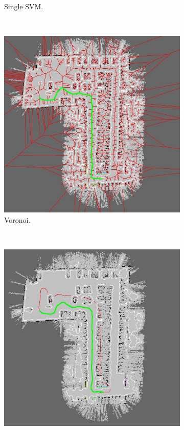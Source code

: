 \begin{figure}[h!]
\begin{subfigure}[b]{0.45\textwidth}
	  \caption{Single \ac{SVM}.}
	  \label{fig:cp06_singl_svm_final}
  \end{subfigure}
  ~
  \begin{subfigure}[b]{0.45\textwidth}
	  \centering
	  \includegraphics[width=\textwidth,height=\textwidth, trim=0 0 0 0,clip]{figure16}
	  \caption{Voronoi.}
	  \label{fig:cp06_voronoi_final}
  \end{subfigure}%
  ~
  \begin{subfigure}[b]{0.45\textwidth}
	  \centering
	  \includegraphics[width=\textwidth,height=\textwidth, trim=0 0 0 0,clip]{figure17}

\end{subfigure}
\end{figure}
